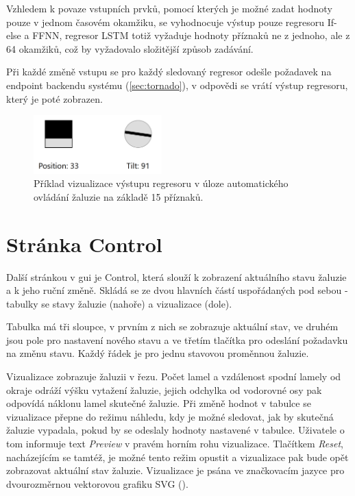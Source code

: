     Vzhledem k povaze vstupních prvků, pomocí kterých je možné zadat hodnoty pouze v jednom časovém okamžiku, se vyhodnocuje výstup pouze regresoru If-else a FFNN, regresor LSTM totiž vyžaduje hodnoty příznaků ne z jednoho, ale z 64 okamžiků, což by vyžadovalo složitější způsob zadávání.
    
    Při každé změně vstupu se pro každý sledovaný regresor odešle požadavek na endpoint  backendu systému (\cref{sec:tornado}), v odpovědi se vrátí výstup regresoru, který je poté zobrazen.
    \begin{figure}
        \centering
        \includegraphics[draft=\draftfig,width=0.44\textwidth]{img/gui/vizualizace.png}
        \caption[Vizualizace výstupu regresoru]{Příklad vizualizace výstupu regresoru v úloze automatického ovládání žaluzie na základě 15 příznaků.}
        \label{fig:vizualizace}
    \end{figure}
\section{Stránka Control} \label{sec:control}
    Další stránkou v \acrshort{gui} je Control, která slouží k zobrazení aktuálního stavu žaluzie a k jeho ruční změně. Skládá se ze dvou hlavních částí uspořádaných pod sebou - tabulky se stavy žaluzie (nahoře) a vizualizace (dole).

    Tabulka má tři sloupce, v prvním z nich se zobrazuje aktuální stav, ve druhém jsou pole pro nastavení nového stavu a ve třetím tlačítka pro odeslání požadavku na změnu stavu. Každý řádek je pro jednu stavovou proměnnou žaluzie.

    Vizualizace zobrazuje žaluzii v řezu. Počet lamel a vzdálenost spodní lamely od okraje odráží výšku vytažení žaluzie, jejich odchylka od vodorovné osy pak odpovídá náklonu lamel skutečné žaluzie. Při změně hodnot v tabulce se vizualizace přepne do režimu náhledu, kdy je možné sledovat, jak by skutečná žaluzie vypadala, pokud by se odeslaly hodnoty nastavené v tabulce. Uživatele o tom informuje text \emph{Preview} v pravém horním rohu vizualizace. Tlačítkem \emph{Reset}, nacházejícím se tamtéž, je možné tento režim opustit a vizualizace pak bude opět zobrazovat aktuální stav žaluzie. Vizualizace je psána ve značkovacím jazyce pro dvourozměrnou vektorovou grafiku SVG (\cite{w3c:svg}).

